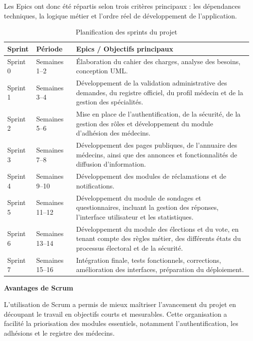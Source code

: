 ﻿\documentclass[12pt,a4paper]{report}
\begin{document}
Les Epics ont donc été répartis selon trois critères principaux : les
dépendances techniques, la logique métier et l'ordre réel de développement de
l'application.

\begin{table}[H]
\centering
\renewcommand{\arraystretch}{1.3}
\begin{tabularx}{0.95\textwidth}{|p{2.4cm}|p{3cm}|X|}
\hline
\textbf{Sprint} & \textbf{Période} & \textbf{Epics / Objectifs principaux} \\
\hline
Sprint 0 & Semaines 1--2 & 
Élaboration du cahier des charges, analyse des besoins, conception UML. \\
\hline
Sprint 1 & Semaines 3--4 & 
Développement de la validation administrative des demandes, du registre officiel, du profil médecin et de la gestion des spécialités. \\
\hline
Sprint 2 & Semaines 5--6 & 
Mise en place de l'authentification, de la sécurité, de la gestion des rôles et développement du module d'adhésion des médecins.
\\
\hline
Sprint 3 & Semaines 7--8 & 
Développement des pages publiques, de l'annuaire des médecins, ainsi que des annonces et fonctionnalités de diffusion d'information. \\
\hline
Sprint 4 & Semaines 9--10 & 
Développement des modules de réclamations et de notifications. \\
\hline
Sprint 5 & Semaines 11--12 & 
Développement du module de sondages et questionnaires, incluant la gestion des réponses, l'interface utilisateur et les statistiques. \\
\hline
Sprint 6 & Semaines 13--14 & 
Développement du module des élections et du vote, en tenant compte des règles métier, des différents états du processus électoral et de la sécurité. \\
\hline
Sprint 7 & Semaines 15--16 & 
Intégration finale, tests fonctionnels, corrections, amélioration des interfaces, préparation du déploiement. \\
\hline
\end{tabularx}
\caption{Planification des sprints du projet}
\label{tab:sprints}
\end{table}

\textbf{Avantages de Scrum}

L'utilisation de Scrum a permis de mieux maîtriser l'avancement du projet en
découpant le travail en objectifs courts et mesurables. Cette organisation a
facilité la priorisation des modules essentiels, notamment
l'authentification, les adhésions et le registre des médecins.
\end{document}
